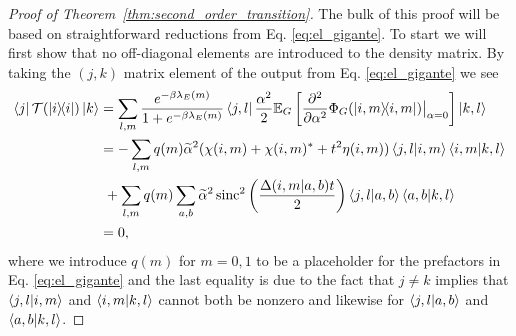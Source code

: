 \begin{proof}[Proof of Theorem~\ref{thm:second_order_transition}]
    The bulk of this proof will be based on straightforward reductions from Eq. \eqref{eq:el_gigante}. To start we will first show that no off-diagonal elements are introduced to the density matrix. By taking the $(j,k)$ matrix element of the output from Eq. \eqref{eq:el_gigante} we see
    \begin{align}
        \bra{j} \mathcal{T}(\ketbra{i}{i})\ket{k} &= \sum_{l, m} \frac{e^{-\beta \lambda_E(m)}}{1 + e^{-\beta \lambda_E(m)}} \bra{j, l} \frac{\alpha^2}{2} \mathbb{E}_{G} \left[ \frac{\partial^2}{\partial \alpha^2} \Phi_G(\ketbra{i, m}{i, m}) \big|_{\alpha = 0} \right] \ket{k, l} \\
        &= - \sum_{l,m} q(m) \widetilde{\alpha}^2 (\chi(i,m) + \chi(i,m)^* + t^2 \eta(i,m)) \braket{j, l}{i, m} \braket{i, m}{k, l} \nonumber \\
        &~ + \sum_{l, m} q(m) \sum_{a,b} \widetilde{\alpha}^2 \operatorname{sinc}^2 \left(\frac{\Delta(i,m|a,b)t }{2} \right) \braket{j, l}{a,b} \braket{a, b}{k, l} \\
        &= 0,
    \end{align}
    where we introduce $q(m)$ for $m=0,1$ to be a placeholder for the prefactors in Eq. \eqref{eq:el_gigante} and the last equality is due to the fact that $j \neq k$ implies that $\braket{j, l}{i,m}$ and $\braket{i,m}{k, l}$ cannot both be nonzero and likewise for $\braket{j, l}{a,b}$ and $\braket{a,b}{k,l}$.
    

\end{proof}
